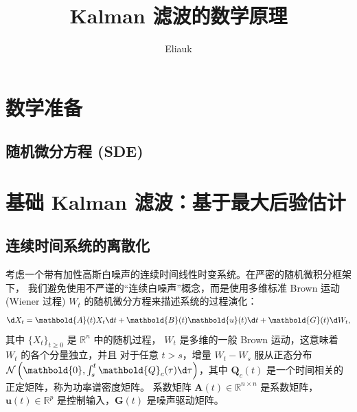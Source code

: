 \documentclass[fontset=none,zihao=-4]{Notes}
\title{\sffamily Kalman 滤波的数学原理}
\author{Eliauk}
\newcommand{\mat}[1]{\mathbold{#1}}
\begin{document}
\maketitle

\tableofcontents

\section{数学准备}

\subsection{随机微分方程 (SDE)}

\section{基础 Kalman 滤波：基于最大后验估计}

\subsection{连续时间系统的离散化}

考虑一个带有加性高斯白噪声的连续时间线性时变系统。在严密的随机微积分框架下，
我们避免使用不严谨的“连续白噪声”概念，而是使用多维标准 Brown 运动(Wiener 过程)
$W_t$ 的随机微分方程来描述系统的过程演化：
\begin{equation}\label{eq:sde}
  \d X_t=\mat A(t)X_t\d t+\mat B(t)\mat u(t)\d t+\mat G(t)\d W_t,
\end{equation}
其中 $\{X_t\}_{t\geq 0}$ 是 $\mathbb{R}^n$ 中的随机过程，
$W_t$ 是多维的一般 Brown 运动，这意味着 $W_t$ 的各个分量独立，并且
对于任意 $t>s$，增量 $W_t-W_s$ 服从正态分布 $\mathcal{N}\left(
  \mat 0,\int_s^t \mat Q_c(\tau)\d \tau
\right)$，其中 $\mat Q_c(t)$ 是一个时间相关的正定矩阵，称为功率谱密度矩阵。
系数矩阵 $\mat A(t)\in \mathbb{R}^{n\times n}$ 是系数矩阵，
$\mat u(t)\in \mathbb{R}^p$ 是控制输入，$\mat G(t)$ 是噪声驱动矩阵。
\end{document}

